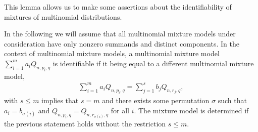 \documentclass[aos,preprint]{imsart}
\theoremstyle{plain}
\theoremstyle{defintion}
\begin{document}
This lemma allows us to make some assertions about the identifiability of mixtures of multinomial distributions.

In the following we will assume that all multinomial mixture models under consideration have only nonzero summands and distinct components. In the context of multinomial mixture models, a multinomial mixture model $\sum_{i=1}^m a_i Q_{n,p_i,q}$ is identifiable if it being equal to a different multinomial mixture model,
\begin{eqnarray*}
	\sum_{i=1}^m a_i Q_{n,p_i,q} = \sum_{j=1}^s b_j Q_{n,r_j,q},
\end{eqnarray*}
with $s\le m$ implies that $s=m$ and there exists some permutation $\sigma$ such that $a_i = b_{\sigma\left( i \right)}$ and $Q_{n,p_i,q} = Q_{n,r_{\sigma\left( i \right)},q}$ for all $i$. The mixture model is determined if the previous statement holds without the restriction $s\le m$.
\end{document}
